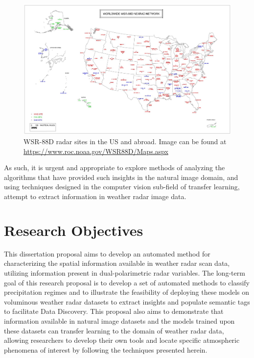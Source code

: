 \begin{figure}[h]
	\centering
	\includegraphics[width=\textwidth]{./thesis_code/plots/noaa_wsr88d_map.jpg}
	\caption{WSR-88D radar sites in the US and abroad. Image can be found at \url{https://www.roc.noaa.gov/WSR88D/Maps.aspx}}
	\label{fig:introduction_wsr88d-map}
\end{figure}

As such, it is urgent and appropriate to explore methods of analyzing the algorithms that have provided such insights in the natural image domain, and using techniques designed in the computer vision sub-field of transfer learning, attempt to extract information in weather radar image data.

\section{Research Objectives}
\label{sec:introduction_objectives}

This dissertation proposal aims to develop an automated method for characterizing the spatial information available in weather radar scan data, utilizing information present in dual-polarimetric radar variables.
The long-term goal of this research proposal is to develop a set of automated methods to classify precipitation regimes and to illustrate the feasibility of deploying these models on voluminous weather radar datasets to extract insights and populate semantic tags to facilitate Data Discovery.
This proposal also aims to demonstrate that information available in natural image datasets and the models trained upon these datasets can transfer learning to the domain of weather radar data, allowing researchers to develop their own tools and locate specific atmospheric phenomena of interest by following the techniques presented herein.


